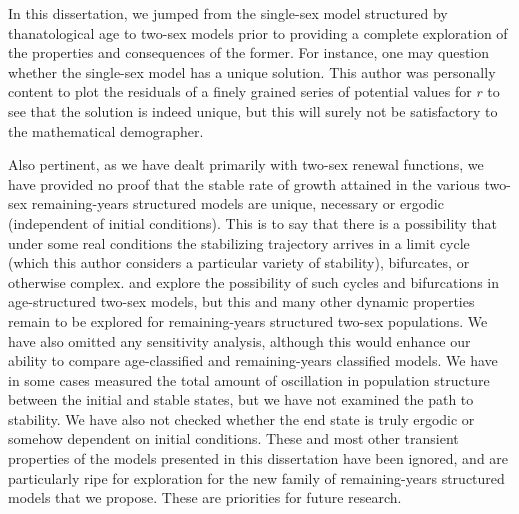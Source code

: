 \FloatBarrier
In this dissertation, we jumped from the single-sex model structured by
thanatological age to two-sex models prior to providing a complete
exploration of the properties and consequences of the former. For instance, one
may question whether the single-sex model has a unique solution. This author was
personally content to plot the residuals of a finely grained series of potential
values for $r$ to see that the solution is indeed unique, but
this will surely not be satisfactory to the mathematical demographer.

Also pertinent, as we have dealt primarily with two-sex renewal functions,
we have provided no proof that the stable rate of growth attained in the various
two-sex remaining-years structured models are unique, necessary or ergodic (independent of initial conditions).
This is to say that there is a possibility that under some real conditions the
stabilizing trajectory arrives in a limit cycle (which this
author considers a particular variety of stability), bifurcates, or otherwise
complex. \citet{wijewickrema1980weak} and \citet{chung1990phd, chung1994cycles}
explore the possibility of such cycles and bifurcations in age-structured
two-sex models, but this and many other dynamic properties remain to be explored for remaining-years structured two-sex
populations. We have also omitted any sensitivity analysis, although this would
enhance our ability to compare age-classified and remaining-years
classified models. We have in some cases measured the total amount of
oscillation in population structure between the initial and stable states, but
we have not examined the path to stability. We have also not checked whether the
end state is truly ergodic or somehow dependent on initial conditions. These and most
other transient properties of the models presented in this dissertation have
been ignored, and are particularly ripe for exploration for the new family of
remaining-years structured models that we propose. These are priorities for
future research.

